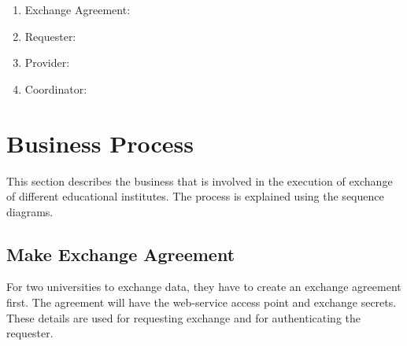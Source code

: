 \documentclass[12pt,a4paper,oneside]{book}
\begin{document}
\begin{enumerate}
\item Exchange Agreement: 

\item Requester: 

\item Provider: 

\item Coordinator: 
	
\end{enumerate}

\section{Business Process}\label{s-business_process}
This section describes the business that is involved in the execution of exchange of different educational institutes. The process is explained using the sequence diagrams.

    \subsection{Make Exchange Agreement}
    For two universities to exchange data, they have to create an exchange agreement first. The agreement will have the web-service access point and exchange secrets. These details are used for requesting exchange and for authenticating the requester.
\end{document}
